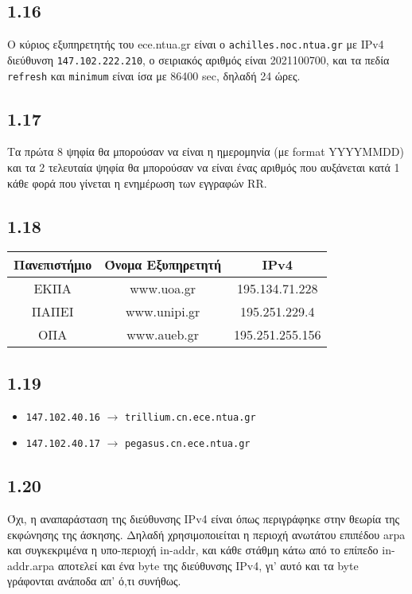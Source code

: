 		\subsection*{1.16} 
			Ο κύριος εξυπηρετητής του ece.ntua.gr είναι ο \verb|achilles.noc.ntua.gr| με IPv4 διεύθυνση \verb|147.102.222.210|, ο σειριακός αριθμός είναι 2021100700, και τα πεδία \verb|refresh| και \verb|minimum| είναι ίσα με 86400 sec, δηλαδή 24 ώρες.

		\subsection*{1.17} 
			Τα πρώτα 8 ψηφία θα μπορούσαν να είναι η ημερομηνία (με format YYYYMMDD) και τα 2 τελευταία ψηφία θα μπορούσαν να είναι ένας αριθμός που αυξάνεται κατά 1 κάθε φορά που γίνεται η ενημέρωση των εγγραφών RR.

		\subsection*{1.18} 
			\begin{tabular}{ |c|c|c| }
				\hline
				Πανεπιστήμιο & Όνομα Εξυπηρετητή & IPv4 \\
				\hline
				ΕΚΠΑ  & www.uoa.gr   & 195.134.71.228   \\
				\hline
				ΠΑΠΕΙ & www.unipi.gr & 195.251.229.4    \\
				\hline
				ΟΠΑ   & www.aueb.gr  & 195.251.255.156  \\
				\hline
			\end{tabular}

		\subsection*{1.19} 
			\begin{itemize}
				\item \verb|147.102.40.16| $\rightarrow$ \verb|trillium.cn.ece.ntua.gr|
				\item \verb|147.102.40.17| $\rightarrow$ \verb|pegasus.cn.ece.ntua.gr|
			\end{itemize}

		\subsection*{1.20} 
			Όχι, η αναπαράσταση της διεύθυνσης IPv4 είναι όπως περιγράφηκε στην θεωρία της εκφώνησης της άσκησης. Δηλαδή χρησιμοποιείται η περιοχή ανωτάτου επιπέδου arpa και συγκεκριμένα η υπο-περιοχή in-addr, και κάθε στάθμη κάτω από το επίπεδο in-addr.arpa αποτελεί και ένα byte της διεύθυνσης IPv4, γι' αυτό και τα byte γράφονται ανάποδα απ' ό,τι συνήθως.

